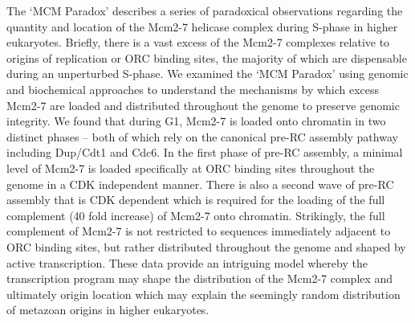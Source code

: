 The `MCM Paradox' describes a %
series of %
paradoxical observations regarding the quantity and location of the Mcm2-7 helicase complex during S-phase in higher eukaryotes\citep{Takahashi2005-bz}. Briefly, there is a vast excess of the Mcm2-7 complexes relative to origins of replication or ORC binding sites, the majority of which are %
dispensable during an unperturbed S-phase. We examined the `MCM Paradox'  using  genomic and biochemical approaches  to understand the mechanisms by which excess Mcm2-7 are loaded and distributed throughout the genome to preserve genomic integrity\citep{Powell2015-af}.  We found that during G1, Mcm2-7 is loaded onto chromatin in two distinct phases -- both of which rely on the canonical pre-RC assembly pathway including Dup/Cdt1 and Cdc6.  In the first phase of pre-RC assembly, a minimal level of Mcm2-7 is loaded specifically at ORC binding sites throughout the genome in a CDK independent manner.  There is also a second wave of pre-RC assembly that is CDK dependent which is required for the loading of the full complement (40 fold increase) of Mcm2-7 onto chromatin.  Strikingly, the full complement of Mcm2-7 is not restricted to sequences immediately adjacent to ORC binding sites, but rather distributed throughout the genome and shaped by active transcription.  %
These data provide an intriguing model whereby the transcription program may shape the distribution of the Mcm2-7 complex and ultimately origin location which may explain the seemingly random distribution of metazoan origins in higher eukaryotes\citep{Petryk2016-rr}.

